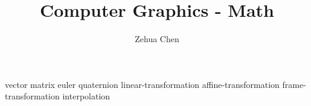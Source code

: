 \documentclass[letterpaper, 11pt]{report}
\title{Computer Graphics - Math}
\author{Zehua Chen}
\begin{document}
  \maketitle
  \tableofcontents

  {vector}
  {matrix}
  {euler}
  {quaternion}
  {linear-transformation}
  {affine-transformation}
  {frame-transformation}
  {interpolation}
\end{document}

